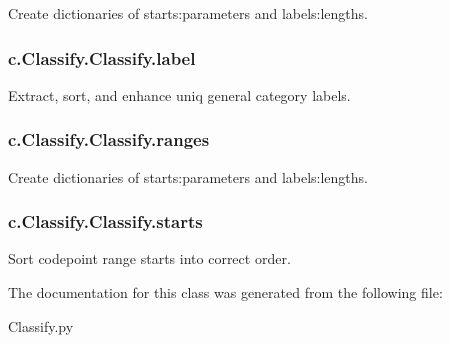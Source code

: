 Create dictionaries of starts\+:parameters and labels\+:lengths. 

\subsubsection[{\texorpdfstring{label}{label}}]{\setlength{\rightskip}{0pt plus 5cm}c.\+Classify.\+Classify.\+label}\hypertarget{classc_1_1_classify_1_1_classify_a39504bd936bf5576befb10e0ac43d83f}{}\label{classc_1_1_classify_1_1_classify_a39504bd936bf5576befb10e0ac43d83f}


Extract, sort, and enhance uniq general category labels. 

\subsubsection[{\texorpdfstring{ranges}{ranges}}]{\setlength{\rightskip}{0pt plus 5cm}c.\+Classify.\+Classify.\+ranges}\hypertarget{classc_1_1_classify_1_1_classify_a1e4a9a02e19f108821677534f7e8d60a}{}\label{classc_1_1_classify_1_1_classify_a1e4a9a02e19f108821677534f7e8d60a}


Create dictionaries of starts\+:parameters and labels\+:lengths. 

\subsubsection[{\texorpdfstring{starts}{starts}}]{\setlength{\rightskip}{0pt plus 5cm}c.\+Classify.\+Classify.\+starts}\hypertarget{classc_1_1_classify_1_1_classify_afdb329410c16ea92a7ac17476f576fde}{}\label{classc_1_1_classify_1_1_classify_afdb329410c16ea92a7ac17476f576fde}


Sort codepoint range starts into correct order. 



The documentation for this class was generated from the following file\+:\begin{DoxyCompactItemize}
\item 
Classify.\+py\end{DoxyCompactItemize}

